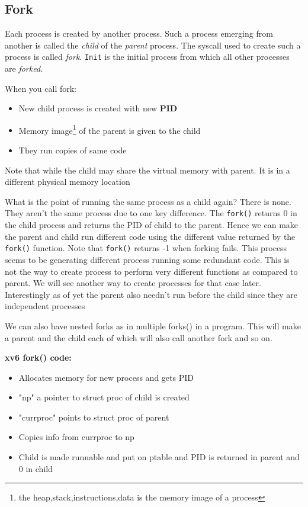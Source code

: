 \documentclass[12pt]{article}
\begin{document}
\subsection{Fork}
Each process is created by another process. Such a process emerging from another is called the \textit{child} of the \textit{parent} process.
The syscall used to create such a process is called \textit{fork}. \texttt{Init} is the initial process from which all other processes are \textit{forked}.

When you call fork:
\begin{itemize}[topsep=0pt, partopsep=0pt, itemsep=0pt, parsep=0pt]
    \item New child process is created with new \textbf{PID}
    \item Memory image\footnote{the heap,stack,instructions,data is the memory image of a process} of the parent is given to the child
    \item They run copies of same code
\end{itemize}
Note that while the child may share the virtual memory with parent. It is in a different physical memory location


What is the point of running the same process as a child again? There is none. They aren't the same process due to one key difference.
The \texttt{fork()} returns 0 in the child process and returns the PID of child to the parent. Hence we can make the parent and child run different code
using the different value returned by the \texttt{fork()} function. Note that \texttt{fork()} returns -1 when forking fails. This process seems to be generating different process running some redundant code.
This is not the way to create process to perform very different functions as compared to parent.
We will see another way to create processes for that case
later. Interestingly as of yet the parent also needn't run before the child since they are independent processes

We can also have nested forks as in multiple forks() in a program. This will make a parent and the child each of which will also call another fork and so on.


\textbf{xv6 fork() code:}
\begin{itemize}[topsep=0pt, partopsep=0pt, itemsep=0pt, parsep=0pt]
    \item Allocates memory for new process and gets PID
    \item "np" a pointer to struct proc of child is created
    \item "currproc" points to struct proc of parent
    \item Copies info from currproc to np
    \item Child is made runnable and put on ptable and PID is returned in parent and 0 in child
\end{itemize}
\end{document}
